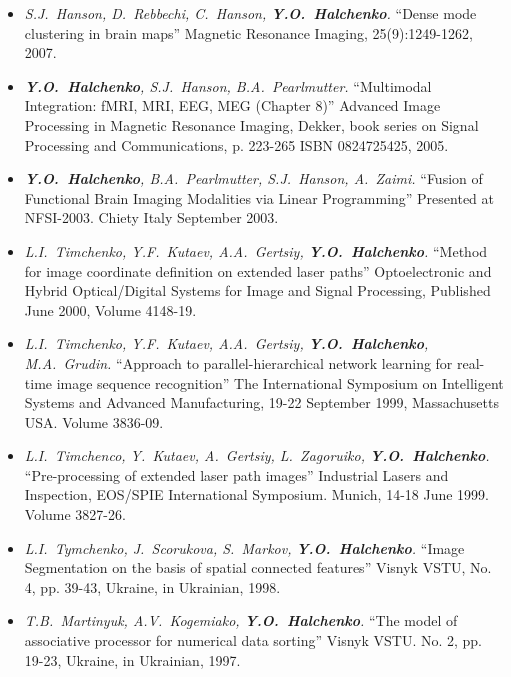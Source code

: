 \documentclass[12pt,overlapped,line]{res}
\newcommand{\mtitle}[1]{``#1''}
\newcommand{\mauthors}[1]{ \textit{#1.}}
\newcommand{\mwhere}[1]{#1.}
\begin{document}
\begin{resume}
\begin{itemize}
  \item
    \mauthors{S.J.~Hanson, D.~Rebbechi, C.~Hanson, \textbf{Y.O.~Halchenko}}
    \mtitle{Dense mode clustering in brain maps}
    \mwhere{Magnetic Resonance Imaging, 25(9):1249-1262, 2007}

  \item
    \mauthors{\textbf{Y.O.~Halchenko}, S.J.~Hanson, B.A.~Pearlmutter}
    \mtitle{Multimodal Integration: fMRI, MRI, EEG, MEG (Chapter 8)}
    \mwhere{Advanced Image Processing in Magnetic Resonance Imaging,
      Dekker, book series on Signal Processing and Communications, p. 223-265
      ISBN 0824725425, 2005}

  \item
     \mauthors{\textbf{Y.O.~Halchenko}, B.A.~Pearlmutter, S.J.~Hanson, A.~Zaimi}
     \mtitle{Fusion of Functional Brain Imaging Modalities via Linear Programming}
     \mwhere{Presented at NFSI-2003. Chiety Italy September 2003}

  \item
     \mauthors{L.I.~Timchenko, Y.F.~Kutaev, A.A.~Gertsiy, \textbf{Y.O.~Halchenko}}
     \mtitle{Method for image coordinate definition on extended laser paths}
     \mwhere{Optoelectronic and Hybrid Optical/Digital Systems for Image and Signal Processing, Published June 2000,  Volume 4148-19}

  \item
     \mauthors{L.I.~Timchenko, Y.F.~Kutaev, A.A.~Gertsiy, \textbf{Y.O.~Halchenko},
     M.A.~Grudin}
     \mtitle{Approach to parallel-hierarchical network learning for real-time image sequence recognition}
     \mwhere{The International Symposium on Intelligent Systems and Advanced Manufacturing, 19-22 September 1999, Massachusetts USA. Volume 3836-09}

   \item
     \mauthors{L.I.~Timchenco, Y.~Kutaev, A.~Gertsiy, L.~Zagoruiko, \textbf{Y.O.~Halchenko}}
     \mtitle{Pre-processing of extended laser path images}
     \mwhere{Industrial Lasers and Inspection, EOS/SPIE International Symposium. Munich, 14-18 June 1999. Volume 3827-26}

   \item
     \mauthors{L.I.~Tymchenko, J.~Scorukova, S.~Markov, \textbf{Y.O.~Halchenko}}
     \mtitle{Image Segmentation on the basis of spatial connected features}
     \mwhere{Visnyk VSTU, No. 4, pp. 39-43, Ukraine, in Ukrainian, 1998}

   \item
     \mauthors{T.B.~Martinyuk, A.V.~Kogemiako, \textbf{Y.O.~Halchenko}}
     \mtitle{The model of associative processor for numerical data sorting}
     \mwhere{ Visnyk VSTU. No. 2, pp. 19-23, Ukraine, in Ukrainian, 1997}


\end{itemize}
\end{resume}
\end{document}
